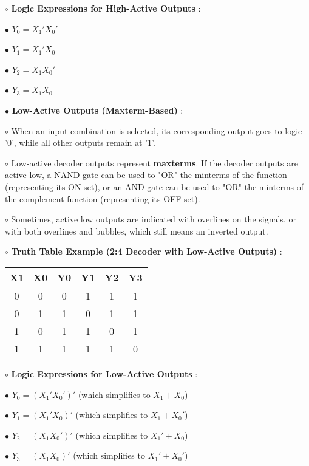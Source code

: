 \documentclass{article}
\begin{document}
\begin{itemize}
\begin{tabular}{c c | c c c c}
\end{tabular}



    $\circ$ \textbf{Logic Expressions for High-Active Outputs} :

        $\bullet$ $Y_0 = X_1' X_0'$

        $\bullet$ $Y_1 = X_1' X_0$

        $\bullet$ $Y_2 = X_1 X_0'$

        $\bullet$ $Y_3 = X_1 X_0$

$\bullet$ \textbf{Low-Active Outputs (Maxterm-Based)} :

    $\circ$ When an input combination is selected, its corresponding output goes to logic '0', while all other outputs remain at '1'.

    $\circ$ Low-active decoder outputs represent \textbf{maxterms}. If the decoder outputs are active low, a NAND gate can be used to "OR" the minterms of the function (representing its ON set), or an AND gate can be used to "OR" the minterms of the complement function (representing its OFF set).

    $\circ$ Sometimes, active low outputs are indicated with overlines on the signals, or with both overlines and bubbles, which still means an inverted output.

    $\circ$ \textbf{Truth Table Example (2:4 Decoder with Low-Active Outputs)} : 
    \begin{tabular}{c c | c c c c}
    \toprule
     X1 & X0 & Y0 & Y1 & Y2 & Y3 \\
    \midrule
     0 & 0 & 0 & 1 & 1 & 1 \\
     0 & 1 & 1 & 0 & 1 & 1 \\
     1 & 0 & 1 & 1 & 0 & 1 \\
     1 & 1 & 1 & 1 & 1 & 0 \\
    \bottomrule
    

\end{tabular}



    $\circ$ \textbf{Logic Expressions for Low-Active Outputs} :

        $\bullet$ $Y_0 = (X_1' X_0')'$ (which simplifies to $X_1 + X_0$)

        $\bullet$ $Y_1 = (X_1' X_0)'$ (which simplifies to $X_1 + X_0'$)

        $\bullet$ $Y_2 = (X_1 X_0')'$ (which simplifies to $X_1' + X_0$)

        $\bullet$ $Y_3 = (X_1 X_0)'$ (which simplifies to $X_1' + X_0'$)


\end{itemize}
\end{document}
